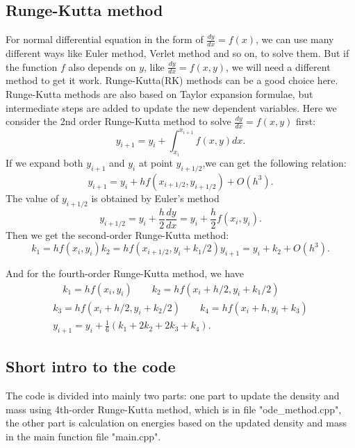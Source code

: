 \documentclass{article}
\begin{document}
\subsection{Runge-Kutta method}
For normal differential equation in the form of $\frac{dy}{dx}= f(x)$, we can use many different ways like Euler method, Verlet method and so on, to solve them. But if the function $f$ also depends on
 $y$, like $\frac{dy}{dx}= f(x,y)$, we will need a different method to get it work. Runge-Kutta(RK) methods can be a good choice here. Runge-Kutta methods are also based on Taylor expansion formulae, but intermediate steps are added to update the new dependent variables.
Here we consider the 2nd order Runge-Kutta method to solve $\frac{dy}{dx}= f(x,y)$ first:
\begin{equation}
y_{i+1} =y_i + \int_{x_i}^{x_{i+1}} f(x,y)dx.
\end{equation}  
If we expand both $y_{i+1}$ and $y_i$ at point $y_{i+1/2}$,we can get the following relation:
\begin{equation}
y_{i+1} =y_i + hf(x_{i+1/2}, y_{i+1/2}) +O(h^3).
\end{equation}
The value of $y_{i+1/2}$ is obtained by Euler's method
\begin{equation}
y_{i+1/2}= y_i + \frac{h}{2}\frac{dy}{dx}= y_i+ \frac{h}{2}f(x_i,y_i).
\end{equation}
Then we get the second-order Runge-Kutta method:
\begin{equation}
k_1= h f(x_i,y_i)
k_2 = h f(x_{i+1/2},y_i+k_1/2)
y_{i+1} = y_i + k_2 + O(h^3).
\end{equation}

And for the fourth-order Runge-Kutta method, we have\cite{Computational}
\begin{equation}
\begin{aligned}
\quad k_1 =hf(x_i,y_i) \qquad k_2=hf(x_i+h/2,y_i+k_1/2)\\
k_3=hf(x_i+h/2,y_i + k_2/2) \qquad k_4=hf(x_i+h, y_i+k_3)\\
y_{i+1} = y_i +\frac{1}{6}(k_1+2k_2+2k_3+k_4).
\end{aligned}
\end{equation}

\subsection{Short intro to the code }
The code is divided into mainly two parts: one part to update the density and mass using 4th-order Runge-Kutta method, which is in file "ode\_method.cpp", the other part is calculation on energies based on the updated density and mass in the main function file "main.cpp".
\end{document}
